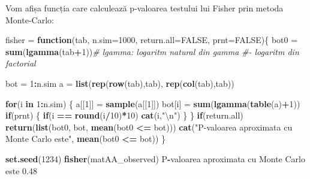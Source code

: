 \documentclass[]{article}
\newenvironment{Shaded}{\begin{snugshade}}{\end{snugshade}}
\newcommand{\KeywordTok}[1]{\textcolor[rgb]{0.13,0.29,0.53}{\textbf{#1}}}
\newcommand{\DataTypeTok}[1]{\textcolor[rgb]{0.13,0.29,0.53}{#1}}
\newcommand{\DecValTok}[1]{\textcolor[rgb]{0.00,0.00,0.81}{#1}}
\newcommand{\FloatTok}[1]{\textcolor[rgb]{0.00,0.00,0.81}{#1}}
\newcommand{\CharTok}[1]{\textcolor[rgb]{0.31,0.60,0.02}{#1}}
\newcommand{\StringTok}[1]{\textcolor[rgb]{0.31,0.60,0.02}{#1}}
\newcommand{\CommentTok}[1]{\textcolor[rgb]{0.56,0.35,0.01}{\textit{#1}}}
\newcommand{\OtherTok}[1]{\textcolor[rgb]{0.56,0.35,0.01}{#1}}
\newcommand{\ControlFlowTok}[1]{\textcolor[rgb]{0.13,0.29,0.53}{\textbf{#1}}}
\newcommand{\OperatorTok}[1]{\textcolor[rgb]{0.81,0.36,0.00}{\textbf{#1}}}
\newcommand{\NormalTok}[1]{#1}
\begin{document}
Vom afișa funcția care calculează p-valoarea testului lui Fisher prin
metoda Monte-Carlo:

\begin{Shaded}
\begin{Highlighting}[]
\NormalTok{fisher =}\StringTok{ }\ControlFlowTok{function}\NormalTok{(tab, }\DataTypeTok{n.sim=}\DecValTok{1000}\NormalTok{, }\DataTypeTok{return.all=}\OtherTok{FALSE}\NormalTok{, }\DataTypeTok{prnt=}\OtherTok{FALSE}\NormalTok{)\{}
\NormalTok{  bot0 =}\StringTok{ }\KeywordTok{sum}\NormalTok{(}\KeywordTok{lgamma}\NormalTok{(tab}\OperatorTok{+}\DecValTok{1}\NormalTok{))}\CommentTok{# lgamma: logaritm natural din gamma }
                            \CommentTok{#- logaritm din factorial}

\NormalTok{  bot =}\StringTok{ }\DecValTok{1}\OperatorTok{:}\NormalTok{n.sim}
\NormalTok{  a =}\StringTok{ }\KeywordTok{list}\NormalTok{(}\KeywordTok{rep}\NormalTok{(}\KeywordTok{row}\NormalTok{(tab),tab), }\KeywordTok{rep}\NormalTok{(}\KeywordTok{col}\NormalTok{(tab),tab))}
  
  \ControlFlowTok{for}\NormalTok{(i }\ControlFlowTok{in} \DecValTok{1}\OperatorTok{:}\NormalTok{n.sim) \{}
\NormalTok{    a[[}\DecValTok{1}\NormalTok{]] =}\StringTok{ }\KeywordTok{sample}\NormalTok{(a[[}\DecValTok{1}\NormalTok{]])}
\NormalTok{    bot[i] =}\StringTok{ }\KeywordTok{sum}\NormalTok{(}\KeywordTok{lgamma}\NormalTok{(}\KeywordTok{table}\NormalTok{(a)}\OperatorTok{+}\DecValTok{1}\NormalTok{))}
    \ControlFlowTok{if}\NormalTok{(prnt) \{ }\ControlFlowTok{if}\NormalTok{(i }\OperatorTok{==}\StringTok{ }\KeywordTok{round}\NormalTok{(i}\OperatorTok{/}\DecValTok{10}\NormalTok{)}\OperatorTok{*}\DecValTok{10}\NormalTok{) }\KeywordTok{cat}\NormalTok{(i,}\StringTok{"}\CharTok{\textbackslash{}n}\StringTok{"}\NormalTok{) \}}
\NormalTok{  \}}
  \ControlFlowTok{if}\NormalTok{(return.all) }\KeywordTok{return}\NormalTok{(}\KeywordTok{list}\NormalTok{(bot0, bot, }\KeywordTok{mean}\NormalTok{(bot0 }\OperatorTok{<=}\StringTok{ }\NormalTok{bot)))}
  \KeywordTok{cat}\NormalTok{(}\StringTok{"P-valoarea aproximata cu Monte Carlo este"}\NormalTok{, }\KeywordTok{mean}\NormalTok{(bot0 }\OperatorTok{<=}\StringTok{ }\NormalTok{bot))}
\NormalTok{\}}

\KeywordTok{set.seed}\NormalTok{(}\DecValTok{1234}\NormalTok{)}
\KeywordTok{fisher}\NormalTok{(matAA_observed)}
\NormalTok{P}\OperatorTok{-}\NormalTok{valoarea aproximata cu Monte Carlo este }\FloatTok{0.48}
\end{Highlighting}
\end{Shaded}
\end{document}
